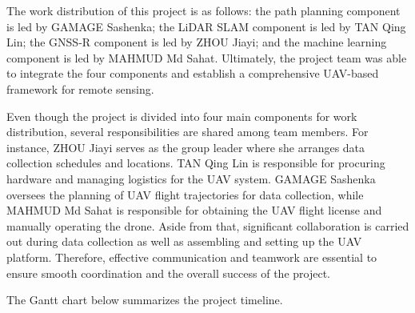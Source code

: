\documentclass[12pt, a4paper]{article}
\begin{document}
The work distribution of this project is as follows: the path planning component
is led by GAMAGE Sashenka; the LiDAR SLAM component is led by TAN Qing Lin; the
GNSS-R component is led by ZHOU Jiayi; and the machine learning component is led
by MAHMUD Md Sahat. Ultimately, the project team was able to integrate the four
components and establish a comprehensive UAV-based framework for remote
sensing.

Even though the project is divided into four main components for work distribution, several responsibilities are shared among team members. For instance, ZHOU Jiayi serves as the group leader where she arranges data collection schedules and locations. TAN Qing Lin is responsible for procuring hardware and managing logistics for the UAV system. GAMAGE Sashenka oversees the planning of UAV flight trajectories for data collection, while MAHMUD Md Sahat is responsible for obtaining the UAV flight license and manually operating the drone. Aside from that, significant collaboration is carried out during data collection as well as assembling and setting up the UAV platform. Therefore, effective communication and teamwork are essential to ensure smooth coordination and the overall success of the project.

The Gantt chart below summarizes the project timeline.
\end{document}
